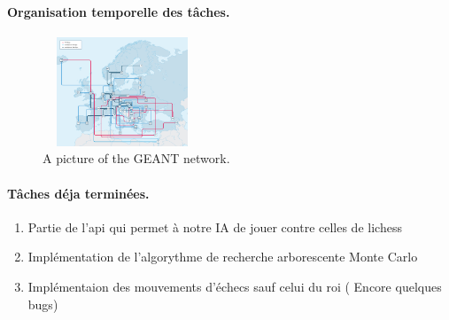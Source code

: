 \documentclass{article}
\begin{document}
\paragraph{Organisation temporelle des tâches.}
\begin{figure}[h]
  \label{fig:geant}
  \hrulefill
  \begin{center}
  \includegraphics[height=123px,width=180px]{geant}
  \end{center}
  \caption{A picture of the GEANT network.}
  \hrulefill
\end{figure}



\paragraph{Tâches déja terminées.}
\begin{enumerate}
  \item Partie de l'api qui permet à notre IA de jouer contre celles de lichess
  \item Implémentation de l'algorythme de recherche arborescente Monte Carlo
  \item Implémentaion des mouvements d'échecs sauf celui du roi ( Encore quelques bugs)
\end{enumerate}
\end{document}
